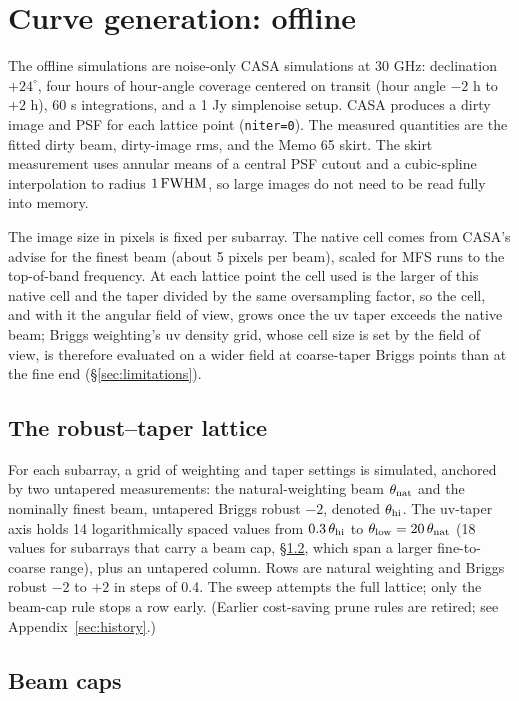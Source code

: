 \documentclass[11pt]{article}
\begin{document}
\section{Curve generation: offline}
\label{sec:curvegen}

The offline simulations are noise-only CASA simulations at 30 GHz:
declination $+24^\circ$, four hours of hour-angle coverage centered on
transit (hour angle $-2$ h to $+2$ h), 60 s integrations, and a 1 Jy
simplenoise setup.  CASA produces a dirty image and PSF for each lattice
point (\texttt{niter=0}).  The measured quantities are the fitted dirty
beam, dirty-image rms, and the Memo 65 skirt.  The skirt measurement uses
annular means of a central PSF cutout and a cubic-spline interpolation to
radius $1\,{\rm FWHM}$, so large images do not need to be read fully into
memory.

The image size in pixels is fixed per subarray.  The native cell comes from
CASA's advise for the finest beam (about 5 pixels per beam), scaled for MFS
runs to the top-of-band frequency.  At each lattice point the cell used is
the larger of this native cell and the taper divided by the same
oversampling factor, so the cell, and with it the angular field of view,
grows once the uv taper exceeds the native beam; Briggs weighting's uv
density grid, whose cell size is set by the field of view, is therefore
evaluated on a wider field at coarse-taper Briggs points than at the fine
end (\S\ref{sec:limitations}).

\subsection{The robust--taper lattice}
\label{sec:lattice}

For each subarray, a grid of weighting and taper settings is simulated,
anchored by two untapered measurements: the natural-weighting beam
$\theta_{\rm nat}$ and the nominally finest beam, untapered Briggs robust
$-2$, denoted $\theta_{\rm hi}$.  The uv-taper axis holds 14
logarithmically spaced values from $0.3\,\theta_{\rm hi}$ to
$\theta_{\rm low} = 20\,\theta_{\rm nat}$ (18 values for subarrays that
carry a beam cap, \S\ref{sec:beamcap}, which span a larger fine-to-coarse
range), plus an untapered column.  Rows are natural weighting and Briggs
robust $-2$ to $+2$ in steps of 0.4.  The sweep attempts the full lattice;
only the beam-cap rule stops a row early.  (Earlier cost-saving prune
rules are retired; see Appendix~\ref{sec:history}.)

\subsection{Beam caps}
\label{sec:beamcap}
\end{document}
